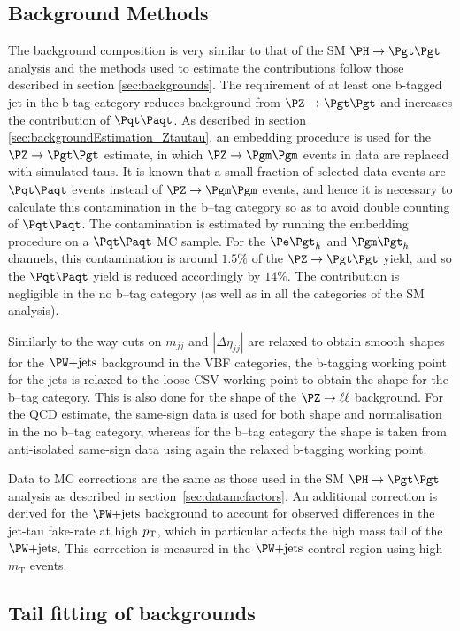 \subsection{Background Methods}
\label{sec:mssmBackgrounds}
The background composition is very similar to that of the \ac{SM} $\HToTauTau$
analysis and the methods used to estimate the contributions follow those
described in section \ref{sec:backgrounds}. The requirement of at least one
b-tagged jet in the b-tag category reduces background from $\ZToTauTau$
and increases the contribution of $\ttbar$. As described in section
\ref{sec:backgroundEstimation_Ztautau}, an embedding procedure is used for the
$\ZToTauTau$ estimate, in which $\PZ\to\Pgm\Pgm$ events in data are replaced
with simulated taus. It is known that a small fraction of selected data events
are $\ttbar$ events instead of $\PZ\to\Pgm\Pgm$ events, and hence it is
necessary to calculate this contamination in the b--tag category so as to avoid
double counting of $\ttbar$. The contamination is estimated by running the
embedding procedure on a $\ttbar$ \ac{MC} sample. For the $\etau$ and $\mutau$ channels, this
contamination is around $1.5\%$ of the $\ZToTauTau$ yield, and so the $\ttbar$ yield is reduced
accordingly by $14\%$. The contribution is negligible in the no b--tag category (as well
as in all the categories of the \ac{SM} analysis). 

Similarly to the way cuts on $m_{jj}$ and $|\Delta\eta_{jj}|$ are relaxed to
obtain smooth shapes for the $\WJets$ background in the VBF categories, the
b-tagging working point for the jets is relaxed to the loose \ac{CSV} working point to
obtain the shape for the b--tag category. This is also done for the shape of
the $\PZ\to\ell\ell$ background. For the QCD estimate, the same-sign data is used for
both shape and normalisation in the no b--tag category, whereas for the b--tag
category the shape is taken from anti-isolated same-sign data using again the relaxed
b-tagging working point.

Data to \ac{MC} corrections are the same as those used in the \ac{SM}
$\HToTauTau$ analysis as described in section~\ref{sec:datamcfactors}. An
additional correction is derived for the $\WJets$ background to account for
observed differences in the jet-tau fake-rate at high $p_{\mathrm{T}}$, which in particular
affects the high mass tail of the $\WJets$. This correction is measured in the
$\WJets$ control region using high $m_{\mathrm{T}}$ events. 

\subsection{Tail fitting of backgrounds}
\label{sec:tailfitting}

